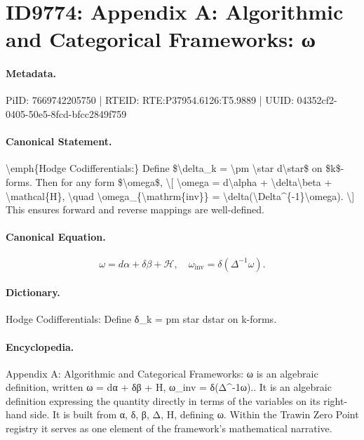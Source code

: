 \section*{ID9774: Appendix A: Algorithmic and Categorical Frameworks: ω}
\paragraph{Metadata.}
PiID: 7669742205750 | RTEID: RTE:P37954.6126:T5.9889 | UUID: 04352cf2-0405-50e5-8fcd-bfcc2849f759

\paragraph{Canonical Statement.}
\textbackslash{}emph\{Hodge Codifferentials:\} Define \$\textbackslash{}delta\_k = \textbackslash{}pm \textbackslash{}star d\textbackslash{}star\$ on \$k\$-forms. Then for any form \$\textbackslash{}omega\$, \textbackslash{}[ \textbackslash{}omega = d\textbackslash{}alpha + \textbackslash{}delta\textbackslash{}beta + \textbackslash{}mathcal\{H\}, \textbackslash{}quad \textbackslash{}omega\_\{\textbackslash{}mathrm\{inv\}\} = \textbackslash{}delta(\textbackslash{}Delta\textasciicircum{}\{-1\}\textbackslash{}omega). \textbackslash{}] This ensures forward and reverse mappings are well-defined.

\paragraph{Canonical Equation.}
\[
\omega = d\alpha + \delta\beta + \mathcal{H}, \quad \omega_{\mathrm{inv}} = \delta(\Delta^{-1}\omega).
\]

\paragraph{Dictionary.}
Hodge Codifferentials: Define δ\_k = pm star dstar on k-forms.

\paragraph{Encyclopedia.}
Appendix A: Algorithmic and Categorical Frameworks: ω is an algebraic definition, written ω = dα + δβ + H, ω\_inv = δ(Δ\textasciicircum{}-1ω).. It is an algebraic definition expressing the quantity directly in terms of the variables on its right-hand side. It is built from α, δ, β, Δ, H, defining ω. Within the Trawin Zero Point registry it serves as one element of the framework's mathematical narrative.
